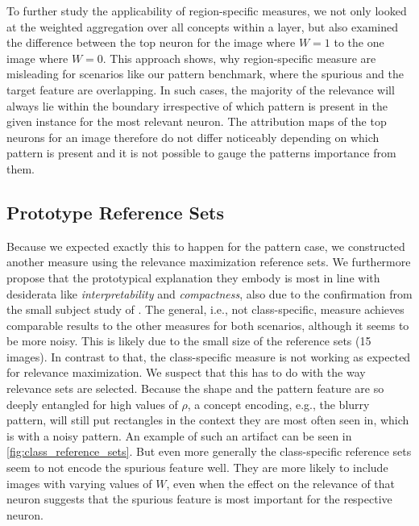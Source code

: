 To further study the applicability of region-specific measures, we not only looked at the weighted aggregation over all concepts within a layer, but also examined the difference between the top neuron for the image where $W=1$ to the one image where $W=0$. This approach shows, why region-specific measure are misleading for scenarios like our pattern benchmark, where the spurious and the target feature are overlapping. In such cases, the majority of the relevance will always lie within the boundary irrespective of which pattern is present in the given instance for the most relevant neuron. The attribution maps of the top neurons for an image therefore do not differ noticeably depending on which pattern is present and it is not possible to gauge the patterns importance from them. 

\subsection{Prototype Reference Sets}
Because we expected exactly this to happen for the pattern case, we constructed another measure using the relevance maximization reference sets. We furthermore propose that the prototypical explanation they embody is most in line with desiderata like \textit{interpretability} and \textit{compactness}, also due to the confirmation from the small subject study of \cite{Achtibat2023}.
The general, i.e., not class-specific, measure achieves comparable results to the other measures for both scenarios, although it seems to be more noisy. This is likely due to the small size of the reference sets (15 images). 
In contrast to that, the class-specific measure is not working as expected for relevance maximization. We suspect that this has to do with the way relevance sets are selected. Because the shape and the pattern feature are so deeply entangled for high values of $\rho$, a concept encoding, e.g., the blurry pattern, will still put rectangles in the context they are most often seen in, which is with a noisy pattern. An example of such an artifact can be seen in \cref{fig:class_reference_sets}. But even more generally the class-specific reference sets seem to not encode the spurious feature well. They are more likely to include images with varying values of $W$, even when the effect on the relevance of that neuron suggests that the spurious feature is most important for the respective neuron.  

